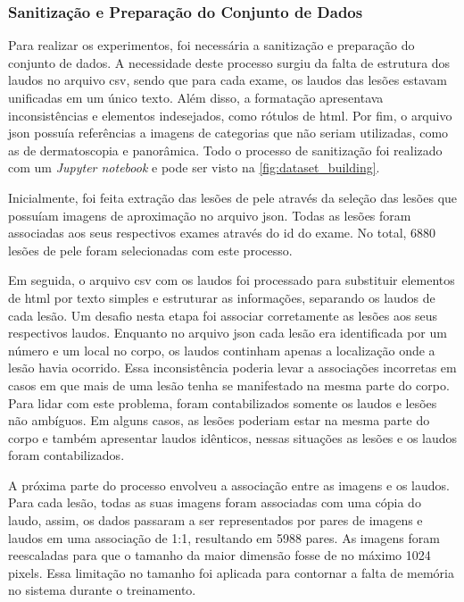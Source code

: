 \subsubsection{Sanitização e Preparação do Conjunto de Dados}

Para realizar os experimentos, foi necessária a sanitização e preparação do conjunto de dados. A necessidade deste
processo surgiu da falta de estrutura dos laudos no arquivo \ac{csv}, sendo que para cada exame, os laudos das
lesões estavam unificadas em um único texto. Além disso, a formatação apresentava inconsistências e elementos
indesejados, como rótulos de \ac{html}. Por fim, o arquivo \ac{json} possuía referências a imagens de categorias que
não seriam utilizadas, como as de dermatoscopia e panorâmica. Todo o processo de sanitização foi realizado com um
\textit{Jupyter notebook} e pode ser visto na \autoref{fig:dataset_building}.

Inicialmente, foi feita extração das lesões de pele através da seleção das lesões que possuíam imagens de aproximação
no arquivo \ac{json}. Todas as lesões foram associadas aos seus respectivos exames através do \ac{id} do exame. No
total, 6880 lesões de pele foram selecionadas com este processo.

Em seguida, o arquivo \ac{csv} com os laudos foi processado para substituir elementos de \ac{html} por texto simples e
estruturar as informações, separando os laudos de cada lesão. Um desafio nesta etapa foi associar corretamente
as lesões aos seus respectivos laudos. Enquanto no arquivo \ac{json} cada lesão era identificada por um número e
um local no corpo, os laudos continham apenas a localização onde a lesão havia ocorrido. Essa inconsistência poderia
levar a associações incorretas em casos em que mais de uma lesão tenha se manifestado na mesma parte do corpo. Para
lidar com este problema, foram contabilizados somente os laudos e lesões não ambíguos. Em alguns casos, as lesões
poderiam estar na mesma parte do corpo e também apresentar laudos idênticos, nessas situações as lesões e os laudos
foram contabilizados.

A próxima parte do processo envolveu a associação entre as imagens e os laudos. Para cada lesão, todas as suas imagens
foram associadas com uma cópia do laudo, assim, os dados passaram a ser representados por pares de imagens e laudos em
uma associação de 1:1, resultando em 5988 pares. As imagens foram reescaladas para que o tamanho da maior dimensão
fosse de no máximo 1024 pixels. Essa limitação no tamanho foi aplicada para contornar a falta de memória no sistema
durante o treinamento.

